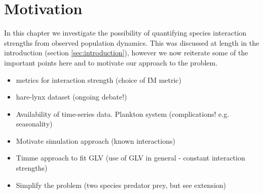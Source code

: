 




\section{Motivation}
\label{sec:motivate_interactions}
In this chapter we investigate the possibility of quantifying species interaction strengths from observed population dynamics. This was discussed at length in the introduction (section \ref{sec:introduction}), however we now reiterate some of the important points here and to motivate our approach to the problem.


\begin{itemize}
	\item metrics for interaction strength (choice of IM metric)
	\item hare-lynx dataset (ongoing debate!)
	\item Availability of time-series data. Plankton system (complications! e.g. seasonality)
	\item Motivate simulation approach (known interactions)
	\item Timme approach to fit GLV (use of GLV in general - constant interaction strengths)
	\item Simplify the problem (two species predator prey, but see extension)
\end{itemize}

